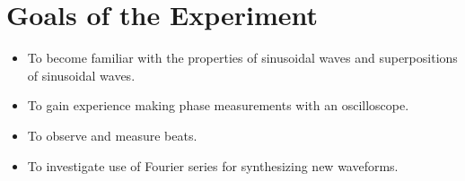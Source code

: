 \section{Goals of the Experiment}
\begin{itemize}
\item To become familiar with the properties of sinusoidal waves and superpositions of sinusoidal waves.
\item  To gain experience making phase measurements with an oscilloscope.
\item To observe and measure beats.
\item To investigate use of Fourier series for synthesizing new waveforms.
\end{itemize}

